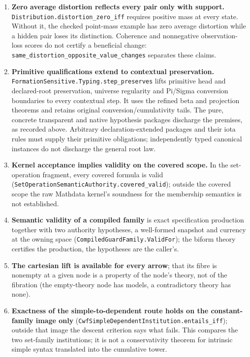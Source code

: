 \documentclass[11pt]{article}
\theoremstyle{definition}
\theoremstyle{remark}
\begin{document}
\begin{enumerate}
\item \textbf{Zero average distortion reflects every pair only with support.}
  \nolinkurl{Distribution.distortion_zero_iff} requires positive mass at
  every state. Without it, the checked point-mass example has zero average
  distortion while a hidden pair loses its distinction. Coherence and
  nonnegative observation-loss scores do not certify a beneficial change:
  \nolinkurl{same_distortion_opposite_value_changes} separates these claims.
\item \textbf{Primitive qualifications extend to contextual preservation.}
  \nolinkurl{FormationSensitive.Typing.step_preserves} lifts primitive head
  and declared-root preservation, universe regularity and Pi/Sigma
  conversion boundaries to every contextual step. It uses the refined beta
  and projection theorems and retains original conversion/cumulativity
  tails. The pure, concrete transparent and native hypothesis packages discharge the premises,
  as recorded above. Arbitrary declaration-extended packages and their iota
  rules must supply their primitive obligations; independently typed
  canonical instances do not discharge the general root law.
\item \textbf{Kernel acceptance implies validity on the covered scope.}  In
  the set-operation fragment, every covered formula is valid
  (\nolinkurl{SetOperationSemanticAuthority.covered_valid}); outside the
  covered scope the raw Mathdata kernel's soundness for the membership
  semantics is not established.
\item \textbf{Semantic validity of a compiled family} is exact specification
  production together with two authority hypotheses, a well-formed snapshot
  and currency at the owning space
  (\nolinkurl{CompiledGuardFamily.ValidFor}); the biform theory certifies the
  production, the hypotheses are the caller's.
\item \textbf{The cartesian lift is available for every arrow}; that its
  fibre is nonempty at a given node is a property of the node's theory, not
  of the fibration (the empty-theory node has models, a contradictory theory
  has none).
\item \textbf{Exactness of the simple-to-dependent route holds on the
  constant-family image only} (\nolinkurl{CwfSimpleDependentInstitution.entails_iff});
  outside that image the descent criterion says what fails. This compares
  the two set-family institutions; it is not a conservativity theorem for
  intrinsic simple syntax translated into the cumulative tower.
\end{enumerate}
\end{document}
